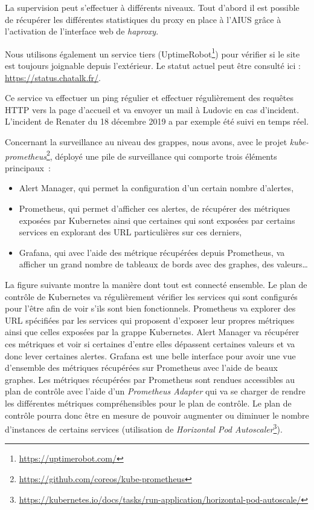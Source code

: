 La supervision peut s'effectuer à différents niveaux. Tout d'abord il
est possible de récupérer les différentes statistiques du proxy en place
à l'AIUS grâce à l'activation de l'interface web de \textit{haproxy}.

Nous utilisons également un service tiers
(UptimeRobot\footnote{\url{https://uptimerobot.com/}})
pour vérifier si le site est toujours joignable depuis l'extérieur. Le
statut actuel peut être consulté ici : \url{https://status.chatalk.fr/}.

Ce service va effectuer un ping régulier et effectuer régulièrement des
requêtes HTTP vers la page d'accueil et va envoyer un mail à Ludovic en
cas d'incident. L'incident de Renater du 18 décembre 2019 a par exemple
été suivi en temps réel.

Concernant la surveillance au niveau des grappes, nous avons, avec le
projet
\textit{kube-prometheus}\footnote{
  \url{https://github.com/coreos/kube-prometheus}},
déployé une pile de surveillance qui comporte trois éléments
principaux\ :

\begin{itemize}
\item
  Alert Manager, qui permet la configuration d'un certain nombre
  d'alertes,
\item
  Prometheus, qui permet d'afficher ces alertes, de récupérer des
  métriques exposées par Kubernetes ainsi que certaines qui sont
  exposées par certains services en explorant des URL particulières sur
  ces derniers,
\item
  Grafana, qui avec l'aide des métrique récupérées depuis Prometheus, va
  afficher un grand nombre de tableaux de bords avec des graphes, des
  valeurs\ldots{}
\end{itemize}

La figure suivante montre la manière dont tout est connecté ensemble. Le
plan de contrôle de Kubernetes va régulièrement vérifier les services
qui sont configurés pour l'être afin de voir s'ils sont bien
fonctionnels. Prometheus va explorer des URL spécifiées par les services
qui proposent d'exposer leur propres métriques ainsi que celles exposées
par la grappe Kubernetes. Alert Manager va récupérer ces métriques et
voir si certaines d'entre elles dépassent certaines valeurs et va donc
lever certaines alertes. Grafana est une belle interface pour avoir une
vue d'ensemble des métriques récupérées sur Prometheus avec l'aide de
beaux graphes. Les métriques récupérées par Prometheus sont rendues
accessibles au plan de contrôle avec l'aide d'un \textit{Prometheus
Adapter} qui va se charger de rendre les différentes métriques
compréhensibles pour le plan de contrôle. Le plan de contrôle pourra
donc être en mesure de pouvoir augmenter ou diminuer le nombre
d'instances de certains services (utilisation de \textit{Horizontal Pod
Autoscaler}\footnote{
  \url{https://kubernetes.io/docs/tasks/run-application/horizontal-pod-autoscale/}}).

